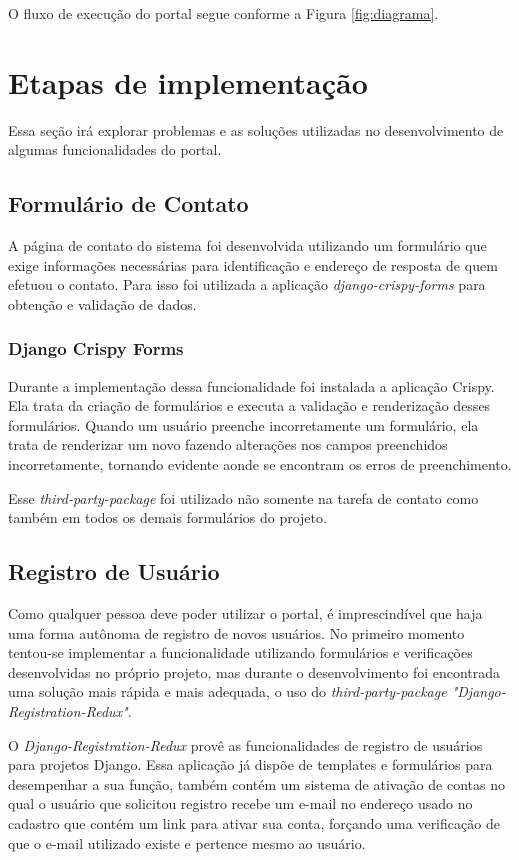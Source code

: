 \documentclass[tg]{mdtufsm}
\begin{document}
O fluxo de execução do portal segue conforme a Figura \ref{fig:diagrama}.

\section{Etapas de implementação}
Essa seção irá explorar problemas e as soluções utilizadas no desenvolvimento de algumas funcionalidades do portal.
\subsection{Formulário de Contato}
A página de contato do sistema foi desenvolvida utilizando um formulário que exige informações necessárias para identificação e endereço de resposta de quem efetuou o contato. Para isso foi utilizada a aplicação \emph{django-crispy-forms} para obtenção e validação de dados.

\subsubsection{Django Crispy Forms}
Durante a implementação dessa funcionalidade foi instalada a aplicação Crispy. Ela trata da criação de formulários e executa a validação e renderização desses formulários. Quando um usuário preenche incorretamente um formulário, ela trata de renderizar um novo fazendo alterações nos campos preenchidos incorretamente, tornando evidente aonde se encontram os erros de preenchimento.

Esse \emph{third-party-package} foi utilizado não somente na tarefa de contato como também em todos os demais formulários do projeto.

\subsection{Registro de Usuário}


Como qualquer pessoa deve poder utilizar o portal, é imprescindível que haja uma forma autônoma de registro de novos usuários. No primeiro momento tentou-se implementar a funcionalidade utilizando formulários e verificações desenvolvidas no próprio projeto, mas durante o desenvolvimento foi encontrada uma solução mais rápida e mais adequada, o uso do \emph{third-party-package "Django-Registration-Redux"}.

O \emph{Django-Registration-Redux} provê as funcionalidades de registro de usuários para projetos Django. Essa aplicação já dispõe de templates e formulários para desempenhar a sua função, também contém um sistema de ativação de contas no qual o usuário que solicitou registro recebe um e-mail no endereço usado no cadastro que contém um link para ativar sua conta, forçando uma verificação de que o e-mail utilizado existe e pertence mesmo ao usuário.
\end{document}
